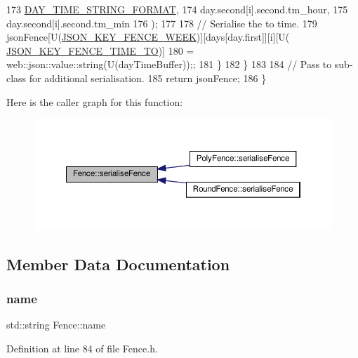 \begin{DoxyCode}
173                      \hyperlink{_fence_8cpp_aa7662fb39f778fae608e70d079dc11ea}{DAY\_TIME\_STRING\_FORMAT},
174                      day.second[i].second.tm\_hour,
175                      day.second[i].second.tm\_min
176             );
177 
178             \textcolor{comment}{// Serialise the to time.}
179             jsonFence[U(\hyperlink{_fence_8h_a94c5efe13ae824c55eebaa9e8a76dd57}{JSON\_KEY\_FENCE\_WEEK})][days[day.first]][i][U(
      \hyperlink{_fence_8h_a5919ead6ef79432d59a9637a993cec9c}{JSON\_KEY\_FENCE\_TIME\_TO})]
180                     = web::json::value::string(U(dayTimeBuffer));;
181         \}
182     \}
183 
184     \textcolor{comment}{// Pass to sub-class for additional serialisation.}
185     \textcolor{keywordflow}{return} jsonFence;
186 \}
\end{DoxyCode}
Here is the caller graph for this function\+:
\nopagebreak
\begin{figure}[H]
\begin{center}
\leavevmode
\includegraphics[width=350pt]{d0/db8/class_fence_a5c8529e80a4444cc9ca0fb660cbf07c8_icgraph}
\end{center}
\end{figure}


\subsection{Member Data Documentation}
\mbox{\label{class_fence_aa405676733f25812b38ea0dd9ccd1863}} 
\subsubsection{\texorpdfstring{name}{name}}
{\footnotesize\ttfamily std\+::string Fence\+::name\hspace{0.3cm}{\ttfamily [private]}}



Definition at line 84 of file Fence.\+h.

